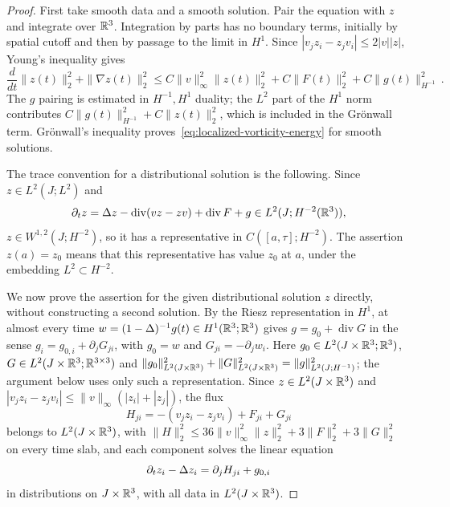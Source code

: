 \documentclass[11pt,letterpaper]{article}
\numberwithin{equation}{section}
\theoremstyle{plain}
\theoremstyle{definition}
\theoremstyle{remark}
\begin{document}
\begin{proof}
First take smooth data and a smooth solution. Pair the equation with $z$ and integrate over $\mathbb{R}^3$. Integration by parts has no boundary terms, initially by spatial cutoff and then by passage to the limit in $H^1$. Since
$|v_jz_i-z_jv_i|\le 2|v||z|$, Young's inequality gives
\[
 \frac{d}{dt}\|z(t)\|_2^2+\|\nabla z(t)\|_2^2
 \le C\|v\|_\infty^2\|z(t)\|_2^2
       +C\|F(t)\|_2^2+C\|g(t)\|_{H^{-1}}^2\,.
\]
The $g$ pairing is estimated in $H^{-1},H^1$ duality; the $L^2$ part of the $H^1$ norm contributes $C\|g(t)\|_{H^{-1}}^2+C\|z(t)\|_2^2$, which is included in the Grönwall term. Grönwall's inequality proves~\eqref{eq:localized-vorticity-energy} for smooth solutions.

The trace convention for a distributional solution is the following. Since $z\in L^2(J;L^2)$ and
\[
 \partial_t z=\Delta z-\operatorname{div}(vz-zv)+\operatorname{div}F+g
       \in L^2(J;H^{-2}(\mathbb{R}^3)),
\]
$z\in W^{1,2}(J;H^{-2})$, so it has a representative in $C([a,\tau];H^{-2})$. The assertion $z(a)=z_0$ means that this representative has value $z_0$ at $a$, under the embedding $L^2\subset H^{-2}$.

We now prove the assertion for the given distributional solution $z$ directly, without constructing a second solution. By the Riesz representation in $H^1$, at almost every time $w=(1-\Delta)^{-1}g(t)\in H^1(\mathbb{R}^3;\mathbb{R}^3)$ gives $g=g_0+\operatorname{div}G$ in the sense $g_i=g_{0,i}+\partial_jG_{ji}$, with $g_0=w$ and $G_{ji}=-\partial_jw_i$. Here $g_0\in L^2(J\times\mathbb{R}^3;\mathbb{R}^3)$, $G\in L^2(J\times\mathbb{R}^3;\mathbb{R}^{3\times3})$ and $\|g_0\|_{L^2(J\times\mathbb{R}^3)}^2+\|G\|_{L^2(J\times\mathbb{R}^3)}^2=\|g\|_{L^2(J;H^{-1})}^2$; the argument below uses only such a representation. Since $z\in L^2(J\times\mathbb{R}^3)$ and $|v_jz_i-z_jv_i|\le\|v\|_\infty(|z_i|+|z_j|)$, the flux
\[
 H_{ji}=-(v_jz_i-z_jv_i)+F_{ji}+G_{ji}
\]
belongs to $L^2(J\times\mathbb{R}^3)$, with $\|H\|_2^2\le 36\|v\|_\infty^2\|z\|_2^2+3\|F\|_2^2+3\|G\|_2^2$ on every time slab, and each component solves the linear equation
\[
 \partial_t z_i-\Delta z_i=\partial_jH_{ji}+g_{0,i}
\]
in distributions on $J\times\mathbb{R}^3$, with all data in $L^2(J\times\mathbb{R}^3)$.


\end{proof}
\end{document}
